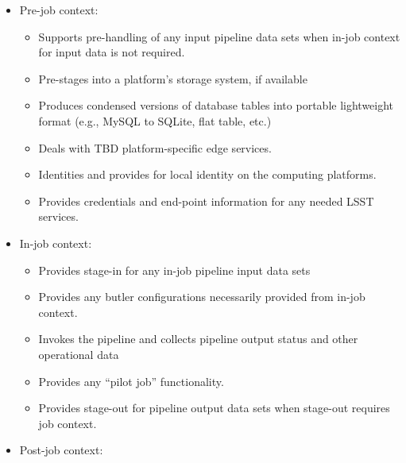 \begin{itemize}

\item Pre-job context:

    \begin{itemize}

    \item Supports pre-handling of any input pipeline data sets when in-job 
    context for input data is not required.

    \item Pre-stages into a platform’s storage system, if available

    \item Produces condensed versions of database tables into portable 
    lightweight format (e.g., MySQL to SQLite, flat table, etc.)

    \item Deals with TBD platform-specific edge services.

    \item Identities and provides for local identity on the computing platforms.

    \item Provides  credentials and end-point information for any needed LSST 
    services. 

    \end{itemize}

\item In-job context:

    \begin{itemize}

    \item Provides stage-in for any in-job pipeline input data sets

    \item Provides any butler configurations necessarily provided from in-job 
    context.

    \item Invokes the pipeline and collects pipeline output status and other 
    operational data

    \item Provides any “pilot job” functionality.

    \item Provides stage-out for pipeline output data sets when stage-out 
    requires job context.

    \end{itemize}

\item Post-job context:


\end{itemize}
